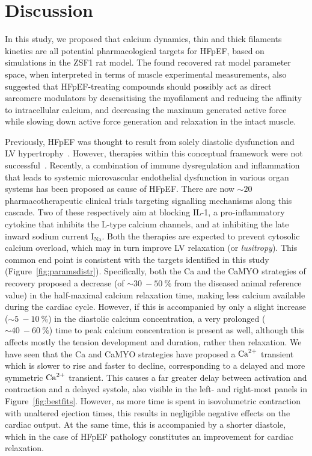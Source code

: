 %
%
%
\section{Discussion}\label{sec:ch7discussion}

\noindent
In this study, we proposed that calcium dynamics, thin and thick filaments kinetics are all potential pharmacological targets for HFpEF, based on simulations in the ZSF1 rat model. The found recovered rat model parameter space, when interpreted in terms of muscle experimental measurements, also suggested that HFpEF-treating compounds should possibly act as direct sarcomere modulators by desensitising the myofilament and reducing the affinity to intracellular calcium, and decreasing the maximum generated active force while slowing down active force generation and relaxation in the intact muscle.

Previously, HFpEF was thought to result from solely diastolic dysfunction and LV hypertrophy~\cite{Patel:2019}. However, therapies within this conceptual framework were not successful~\cite{Cleland:2014}. Recently, a combination of immune dysregulation and inflammation that leads to systemic microvascular endothelial dysfunction in various organ systems has been proposed as cause of HFpEF. There are now $\sim 20$ pharmacotherapeutic clinical trials targeting signalling mechanisms along this cascade. Two of these respectively aim at blocking IL-1, a pro-inflammatory cytokine that inhibits the L-type calcium channels, and at inhibiting the late inward sodium current $\text{I}_{\text{Na}}$. Both the therapies are expected to prevent cytosolic calcium overload, which may in turn improve LV relaxation (or \textit{lusitropy}). This common end point is consistent with the targets identified in this study (Figure~\ref{fig:paramsdistr}). Specifically, both the Ca and the CaMYO strategies of recovery proposed a decrease (of $\sim\SI{30}{}-\SI{50}{\percent}$ from the diseased animal reference value) in the half-maximal calcium relaxation time, making less calcium available during the cardiac cycle. However, if this is accompanied by only a slight increase ($\sim\SI{5}{}-\SI{10}{\percent}$) in the diastolic calcium concentration, a very prolonged ($\sim\SI{40}{}-\SI{60}{\percent}$) time to peak calcium concentration is present as well, although this affects mostly the tension development and duration, rather then relaxation. We have seen that the Ca and CaMYO strategies have proposed a $\textrm{Ca}^{2+}$ transient which is slower to rise and faster to decline, corresponding to a delayed and more symmetric $\textrm{Ca}^{2+}$ transient. This causes a far greater delay between activation and contraction and a delayed systole, also visible in the left- and right-most panels in Figure~\ref{fig:bestfits}. However, as more time is spent in isovolumetric contraction with unaltered ejection times, this results in negligible negative effects on the cardiac output. At the same time, this is accompanied by a shorter diastole, which in the case of HFpEF pathology constitutes an improvement for cardiac relaxation.

